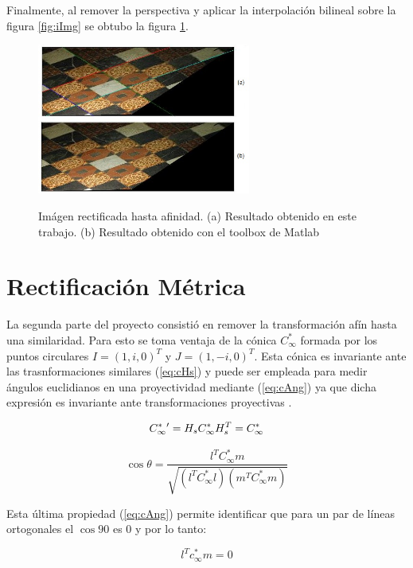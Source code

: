 \documentclass{IEEEtran}
\begin{document}
Finalmente, al remover la perspectiva y aplicar la interpolación bilineal sobre
la figura \ref{fig:iImg} se obtubo la figura \ref{fig:faImg}.

\begin{figure}%
\caption{Imágen rectificada hasta afinidad. (a) Resultado obtenido
en este trabajo. (b) Resultado obtenido con el toolbox de Matlab}
\centering
\includegraphics[width=7cm,natwidth=510,natheight=361]{imgs/cvA.jpg}
\label{fig:faImg}
\end{figure} 

\section{Rectificación Métrica}

La segunda parte del proyecto consistió en remover la transformación
afín hasta una similaridad. Para esto se toma ventaja de la cónica $C^*_{\infty}$ 
formada por los puntos circulares $I=(1,i,0)^T$ y $J=(1,-i,0)^T$. 
Esta cónica es invariante ante las trasnformaciones similares 
(\ref{eq:cHs}) y puede ser empleada para medir ángulos 
euclidianos en una proyectividad mediante (\ref{eq:cAng}) 
ya que dicha expresión es invariante ante transformaciones proyectivas \cite{hartley2000multiple}.

\begin{equation}
C^*_{\infty}\vphantom{}'=H_s C^*_{\infty} H_s^T = C^*_{\infty}
\label{eq:cHs}
\end{equation} 

\begin{equation}
\cos\theta = \frac{l^T C^*_{\infty} m}{\sqrt{(l^T C^*_{\infty} l)(m^T C^*_{\infty} m)}}
\label{eq:cAng}
\end{equation} 

Esta última propiedad (\ref{eq:cAng}) permite identificar que para un par de líneas
ortogonales el $\cos 90$ es 0 y por lo tanto:

\begin{equation}
l^T c^*_{\infty} m = 0
\label{eq:cOrt}
\end{equation}
\end{document}
